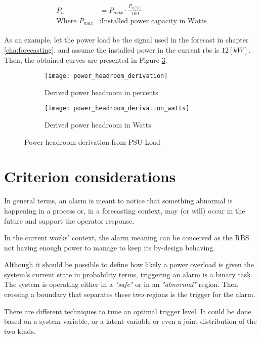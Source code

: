 \begin{align}\label{eq:phwatts}
\begin{split}
		P_h	&= P_{max} \cdot \frac{P_{h[\%]}}{100} \\
	\text{Where } P_{max}	&: \text{Installed power capacity in Watts}
\end{split}
\end{align}

As an example, let the power load be the signal used in the forecast in chapter \ref{cha:forecasting}, and assume the installed power in the current \ac{rbs} is $12[kW]$. Then, the obtained curves are presented in Figure \ref{fig:ph_der}.

\begin{figure}[hptb]
	\centering
	\begin{subfigure}{.6\textwidth}
		\centering
		\texttt{[image: power\_headroom\_derivation]}
		\caption{Derived power headroom in percents}
		\label{fig:ph_der_percent}
	\end{subfigure}%
	\hfill
	\begin{subfigure}{.6\textwidth}
		\centering
		\texttt{[image: power\_headroom\_derivation\_watts]}
		\caption{Derived power headroom in Watts}
		\label{fig:ph_der_watts}
	\end{subfigure}
	\caption{Power headroom derivation from PSU Load}
	\label{fig:ph_der}
\end{figure}

\section{Criterion considerations}

In general terms, an alarm is meant to notice that something abnormal is happening in a process or, in a forecasting context, may (or will) occur in the future and support the operator response\cite{iec_alarms}.

In the current works' context, the alarm meaning can be conceived as the RBS not having enough power to manage to keep its by-design behaving.

Although it should be possible to define how likely a power overload is given the system's current state in probability terms, triggering an alarm is a binary task. The system is operating either in a \emph{"safe"}  or in an \emph{"abnormal"} region. Then crossing a boundary that separates these two regions is the trigger for the alarm. 

There are different techniques to tune an optimal trigger level. It could be done based on a system variable, or a latent variable or even a joint distribution of the two kinds\cite{izadi2009alarms}. 

